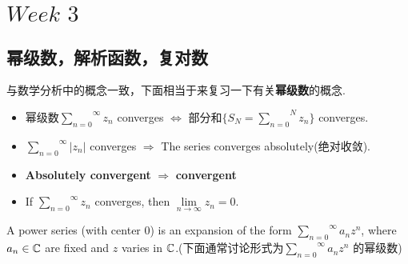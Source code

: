 \ifx\allfiles\undefined


	\else
	\fi

\chapter{$Week \,\, 3$}
\section{幂级数，解析函数，复对数}
与数学分析中的概念一致，下面相当于来复习一下有关\textbf{幂级数}的概念.
\begin{itemize}
	\item 幂级数$\overset{\infty}{\underset{n = 0}{\sum}}{z_n}$ converges $\Leftrightarrow$ 部分和$\{ S_N = \overset{N}{\underset{n = 0}{\sum}}{z_n} \}$ converges.
	
	\item $\overset{\infty}{\underset{n = 0}{\sum}}{\left| z_n \right|}$ converges $\Rightarrow$ The series converges absolutely(绝对收敛).
	
	\item \textbf{Absolutely convergent} $\Rightarrow$ \textbf{convergent}
	
	\item If $\overset{\infty}{\underset{n = 0}{\sum}}{z_n}$ converges, then $\underset{n \to \infty}{\lim}{z_n} = 0$.
\end{itemize}

\vspace{2em}
A power series (with center 0) is an expansion of the form $\overset{\infty}{\underset{n = 0}{\sum}}{a_n z^n}$, where $a_n \in \mathbb{C}$ are fixed and $z$ varies in $\mathbb{C}$.(下面通常讨论形式为$\overset{\infty}{\underset{n = 0}{\sum}}{a_n z^n}$ 的幂级数)

